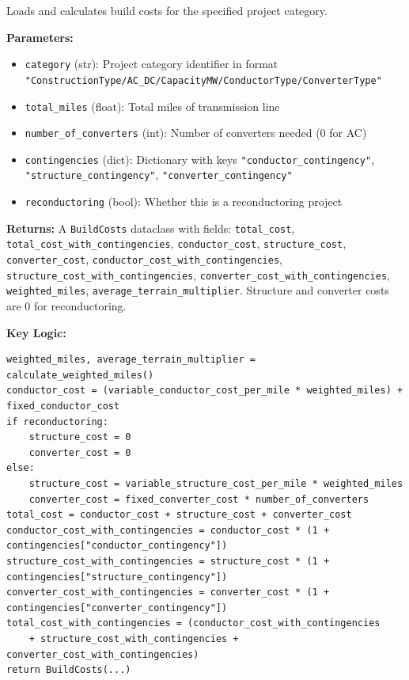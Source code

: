 \documentclass[ctcc_full_documentation.tex]{subfiles}
\begin{document}
Loads and calculates build costs for the specified project category.

\textbf{Parameters:}
\begin{itemize}
    \item \texttt{category} (str): Project category identifier in format \texttt{"ConstructionType/AC\_DC/CapacityMW/ConductorType/ConverterType"}
    \item \texttt{total\_miles} (float): Total miles of transmission line
    \item \texttt{number\_of\_converters} (int): Number of converters needed (0 for AC)
    \item \texttt{contingencies} (dict): Dictionary with keys \texttt{"conductor\_contingency"}, \texttt{"structure\_contingency"}, \texttt{"converter\_contingency"}
    \item \texttt{reconductoring} (bool): Whether this is a reconductoring project
\end{itemize}

\textbf{Returns:} A \texttt{BuildCosts} dataclass with fields: \texttt{total\_cost}, \texttt{total\_cost\_with\_contingencies}, \texttt{conductor\_cost}, \texttt{structure\_cost}, \texttt{converter\_cost}, \texttt{conductor\_cost\_with\_contingencies}, \texttt{structure\_cost\_with\_contingencies}, \texttt{converter\_cost\_with\_contingencies}, \texttt{weighted\_miles}, \texttt{average\_terrain\_multiplier}. Structure and converter costs are 0 for reconductoring.

\textbf{Key Logic:}
\begin{lstlisting}
weighted_miles, average_terrain_multiplier = calculate_weighted_miles()
conductor_cost = (variable_conductor_cost_per_mile * weighted_miles) + fixed_conductor_cost
if reconductoring:
    structure_cost = 0
    converter_cost = 0
else:
    structure_cost = variable_structure_cost_per_mile * weighted_miles
    converter_cost = fixed_converter_cost * number_of_converters
total_cost = conductor_cost + structure_cost + converter_cost
conductor_cost_with_contingencies = conductor_cost * (1 + contingencies["conductor_contingency"])
structure_cost_with_contingencies = structure_cost * (1 + contingencies["structure_contingency"])
converter_cost_with_contingencies = converter_cost * (1 + contingencies["converter_contingency"])
total_cost_with_contingencies = (conductor_cost_with_contingencies
    + structure_cost_with_contingencies + converter_cost_with_contingencies)
return BuildCosts(...)
\end{lstlisting}
\end{document}
